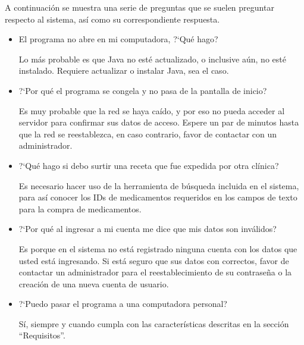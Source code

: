 A continuaci\'on se muestra una serie de preguntas que se suelen preguntar respecto al sistema, as\'i como su correspondiente respuesta.
\begin{itemize}
\item El programa no abre en mi computadora, ?`Qu\'e hago?

Lo m\'as probable es que Java no est\'e actualizado, o inclusive a\'un, no est\'e instalado. Requiere actualizar o instalar Java, sea el caso.
\item ?`Por qu\'e el programa se congela y no pasa de la pantalla de inicio?

Es muy probable que la red se haya ca\'ido, y por eso no pueda acceder al servidor para confirmar sus datos de acceso. Espere un par de minutos hasta que la red se reestablezca, en caso contrario, favor de contactar con un administrador.
\item ?`Qu\'e hago si debo surtir una receta que fue expedida por otra cl\'inica?

Es necesario hacer uso de la herramienta de b\'usqueda incluida en el sistema, para as\'i conocer los IDs de medicamentos requeridos en los campos de texto para la compra de medicamentos.
\item ?`Por qu\'e al ingresar a mi cuenta me dice que mis datos son inv\'alidos?

Es porque en el sistema no est\'a registrado ninguna cuenta con los datos que usted est\'a ingresando. Si est\'a seguro que sus datos con correctos, favor de contactar un administrador para el reestablecimiento de su contraseña o la creaci\'on de una nueva cuenta de usuario.
\item ?`Puedo pasar el programa a una computadora personal?

S\'i, siempre y cuando cumpla con las caracter\'isticas descritas en la secci\'on "`Requisitos"'.

\end{itemize}

